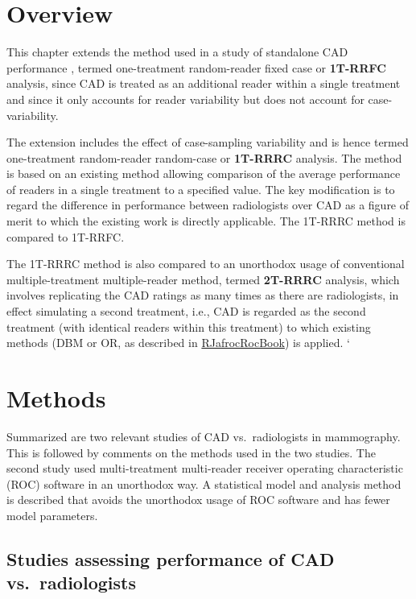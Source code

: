 \documentclass[
]{book}
\begin{document}
\hypertarget{standalone-cad-radiologists-overview}{%
\section{Overview}\label{standalone-cad-radiologists-overview}}

This chapter extends the method used in a study of standalone CAD performance \citep{hupse2013standalone}, termed one-treatment random-reader fixed case or \textbf{1T-RRFC} analysis, since CAD is treated as an additional reader within a single treatment and since it only accounts for reader variability but does not account for case-variability.

The extension includes the effect of case-sampling variability and is hence termed one-treatment random-reader random-case or \textbf{1T-RRRC} analysis. The method is based on an existing method allowing comparison of the average performance of readers in a single treatment to a specified value. The key modification is to regard the difference in performance between radiologists over CAD as a figure of merit to which the existing work is directly applicable. The 1T-RRRC method is compared to 1T-RRFC.

The 1T-RRRC method is also compared to an unorthodox usage of conventional multiple-treatment multiple-reader method, termed \textbf{2T-RRRC} analysis, which involves replicating the CAD ratings as many times as there are radiologists, in effect simulating a second treatment, i.e., CAD is regarded as the second treatment (with identical readers within this treatment) to which existing methods (DBM or OR, as described in \href{https://dpc10ster.github.io/RJafrocRocBook/dbm-analysis-significance-testing.html}{RJafrocRocBook}) is applied.
`

\hypertarget{standalone-cad-radiologists-methods}{%
\section{Methods}\label{standalone-cad-radiologists-methods}}

Summarized are two relevant studies of CAD vs.~radiologists in mammography. This is followed by comments on the methods used in the two studies. The second study used multi-treatment multi-reader receiver operating characteristic (ROC) software in an unorthodox way. A statistical model and analysis method is described that avoids the unorthodox usage of ROC software and has fewer model parameters.

\hypertarget{standalone-cad-radiologists-two-previous-studies}{%
\subsection{Studies assessing performance of CAD vs.~radiologists}\label{standalone-cad-radiologists-two-previous-studies}}
\end{document}
